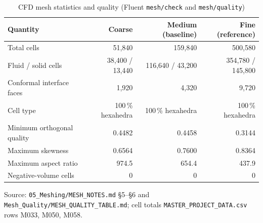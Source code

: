 \begin{table}[htbp]
\centering
\footnotesize
\caption{CFD mesh statistics and quality (Fluent \texttt{mesh/check} and \texttt{mesh/quality})}
\label{tab:meshq}
\begin{tabular}{lrrr}
\toprule
Quantity & Coarse & Medium (baseline) & Fine (reference) \\
\midrule
Total cells & 51,840 & 159,840 & 500,580 \\
Fluid / solid cells & 38,400 / 13,440 & 116,640 / 43,200 & 354,780 / 145,800 \\
Conformal interface faces & 1,920 & 4,320 & 9,720 \\
Cell type & 100\,\% hexahedra & 100\,\% hexahedra & 100\,\% hexahedra \\
Minimum orthogonal quality & 0.4482 & 0.4458 & 0.3144 \\
Maximum skewness & 0.6564 & 0.7600 & 0.8364 \\
Maximum aspect ratio & 974.5 & 654.4 & 437.9 \\
Negative-volume cells & 0 & 0 & 0 \\
\bottomrule
\end{tabular}
\par\smallskip\parbox{\linewidth}{\footnotesize\raggedright Source: \texttt{05\_Meshing/MESH\_NOTES.md} \S5--\S6 and \texttt{Mesh\_Quality/MESH\_QUALITY\_TABLE.md}; cell totals \texttt{MASTER\_PROJECT\_DATA.csv} rows M033, M050, M058.}
\end{table}
